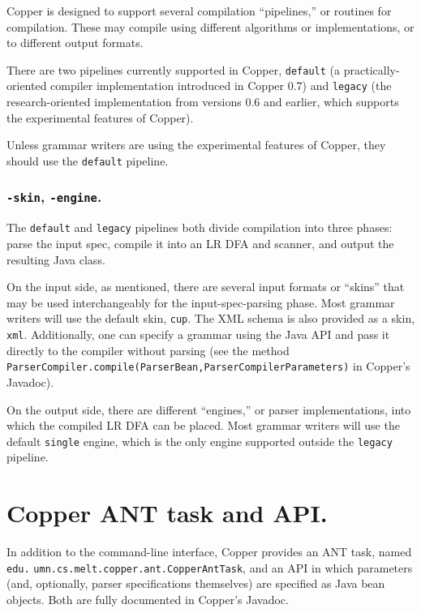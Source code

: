 \documentclass[12pt,english,twoside]{report}
\begin{document}
Copper is designed to support several compilation ``pipelines,'' or routines for compilation. These may compile using different algorithms or implementations, or to different output formats.

There are two pipelines currently supported in Copper,
\texttt{default} (a practically-oriented compiler implementation
introduced in Copper 0.7) and \texttt{legacy} (the research-oriented
implementation from versions 0.6 and earlier, which supports the
experimental features of Copper).

Unless grammar writers are using the experimental features of Copper,
they should use the \texttt{default} pipeline.

\subsubsection{\texttt{-skin}, \texttt{-engine}.}

The \texttt{default} and \texttt{legacy} pipelines both divide compilation
into three phases: parse the input spec, compile it into an LR DFA and
scanner, and output the resulting Java class.

On the input side, as mentioned, there are several input formats or
``skins'' that may be used interchangeably for the input-spec-parsing
phase. Most grammar writers will use the default skin, \texttt{cup}.
The XML schema is also provided as a skin, \texttt{xml}. Additionally,
one can specify a grammar using the Java API and pass it directly to
the compiler without parsing (see the method
\texttt{ParserCompiler.compile(ParserBean,ParserCompilerParameters)}
in Copper's Javadoc).

On the output side, there are different ``engines,'' or parser
implementations, into which the compiled LR DFA can be placed. Most
grammar writers will use the default \texttt{single} engine, which is
the only engine supported outside the \texttt{legacy} pipeline.

\section{Copper ANT task and API.}

In addition to the command-line interface, Copper provides an ANT
task, named \texttt{edu.}
\texttt{umn.}\texttt{cs.}\texttt{melt.}\texttt{copper.}\texttt{ant.}\texttt{CopperAntTask},
and an API in which parameters (and, optionally, parser specifications
themselves) are specified as Java bean objects. Both are fully
documented in Copper's Javadoc.
\end{document}
